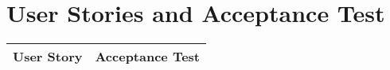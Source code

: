 
\chapter{User Stories and Acceptance Test}
\label{cha:user_stories_and_acceptance_test}

\begin{table}[!htbp]
	\centering
	\begin{tabular}{| l | l |}
	\hline
	User Story & Acceptance Test \\ \hline
	\end{tabular}
\end{table}